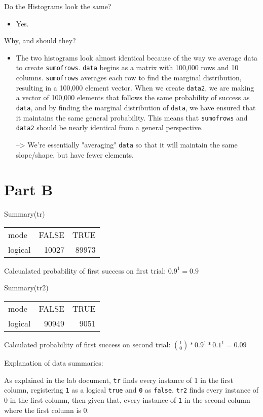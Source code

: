 \documentclass[11pt]{article}
\begin{document}
Do the Histograms look the same?
\begin{itemize}
\item Yes.
\end{itemize}
Why, and should they?
\begin{itemize}
\item The two histograms look almost identical because of the way we average data to create \texttt{sumofrows}.
\texttt{data} begins as a matrix with 100,000 rows and 10 columns. \texttt{sumofrows} averages each row to find the marginal distribution, resulting in a 100,000 element vector.
When we create \texttt{data2}, we are making a vector of 100,000 elements that follows the same probability of success as \texttt{data}, and by finding the marginal distribution of \texttt{data}, we have ensured that it maintains the same general probability.
This means that \texttt{sumofrows} and \texttt{data2} should be nearly identical from a general perspective.

--> We're essentially "averaging" \texttt{data} so that it will maintain the same slope/shape, but have fewer elements.
\end{itemize}
\section*{Part B}
\label{sec:org36a519d}

Summary(tr)
\begin{center}
\begin{tabular}{lrr}
mode & FALSE & TRUE\\[0pt]
logical & 10027 & 89973\\[0pt]
\end{tabular}
\end{center}

Calcualated probability of first success on first trial:
\(0.9^{1}=0.9\)

Summary(tr2)
\begin{center}
\begin{tabular}{lrr}
mode & FALSE & TRUE\\[0pt]
logical & 90949 & 9051\\[0pt]
\end{tabular}
\end{center}

Calculated probability of first success on second trial:
\(\binom{1}{0}*0.9^{1}*0.1^{1}=0.09\)

Explanation of data summaries:

As explained in the lab document, \texttt{tr} finds every instance of 1 in the first column, registering \texttt{1} as a logical \texttt{true} and \texttt{0} as \texttt{false}. \texttt{tr2} finds every instance of 0 in the first column, then given that, every instance of \texttt{1} in the second column where the first column is 0.
\end{document}
